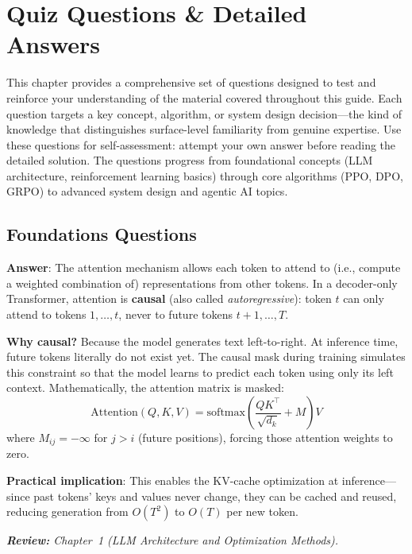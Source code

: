 \chapter{Quiz Questions \& Detailed Answers}
\label{quiz-questions-detailed-answers}

This chapter provides a comprehensive set of questions designed to test and reinforce your understanding of the material covered throughout this guide. Each question targets a key concept, algorithm, or system design decision---the kind of knowledge that distinguishes surface-level familiarity from genuine expertise. Use these questions for self-assessment: attempt your own answer before reading the detailed solution. The questions progress from foundational concepts (LLM architecture, reinforcement learning basics) through core algorithms (PPO, DPO, GRPO) to advanced system design and agentic AI topics.

\section{Foundations Questions}
\label{foundations-questions}

\begin{questionbox}
\textbf{Answer}: The attention mechanism allows each token to attend to (i.e., compute a weighted combination of) representations from other tokens. In a decoder-only Transformer, attention is \textbf{causal} (also called \emph{autoregressive}): token $t$ can only attend to tokens $1, \ldots, t$, never to future tokens $t+1, \ldots, T$.

\textbf{Why causal?} Because the model generates text left-to-right. At inference time, future tokens literally do not exist yet. The causal mask during training simulates this constraint so that the model learns to predict each token using only its left context. Mathematically, the attention matrix is masked: 
\[
\text{Attention}(Q, K, V) = \text{softmax}\!\left(\frac{QK^\top}{\sqrt{d_k}} + M\right) V
\]
 where $M_{ij} = -\infty$ for $j > i$ (future positions), forcing those attention weights to zero.

\textbf{Practical implication}: This enables the KV-cache optimization at inference---since past tokens’ keys and values never change, they can be cached and reused, reducing generation from $O(T^2)$ to $O(T)$ per new token.

\emph{\textbf{Review:} Chapter~1 (LLM Architecture and Optimization Methods).}
\end{questionbox}

